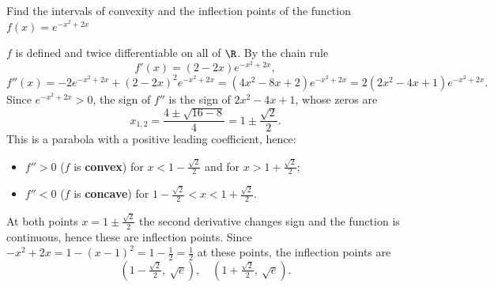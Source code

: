 
\begin{question}
Find the intervals of convexity and the inflection points of the function $f(x)=e^{-x^2+2x}$
\end{question}

\begin{solution}
$f$ is defined and twice differentiable on all of $\R$. By the chain rule
\[ f'(x)=(2-2x)e^{-x^2+2x}, \]
\[ f''(x)=-2e^{-x^2+2x}+(2-2x)^2e^{-x^2+2x}=(4x^2-8x+2)e^{-x^2+2x}=2(2x^2-4x+1)e^{-x^2+2x}. \]
Since $e^{-x^2+2x}>0$, the sign of $f''$ is the sign of $2x^2-4x+1$, whose zeros are
\[ x_{1,2}=\frac{4\pm\sqrt{16-8}}{4}=1\pm\frac{\sqrt2}{2}. \]
This is a parabola with a positive leading coefficient, hence:
\begin{itemize}
  \item $f''>0$ ($f$ is \textbf{convex}) for $x<1-\frac{\sqrt2}{2}$ and for $x>1+\frac{\sqrt2}{2}$;
  \item $f''<0$ ($f$ is \textbf{concave}) for $1-\frac{\sqrt2}{2}<x<1+\frac{\sqrt2}{2}$.
\end{itemize}
At both points $x=1\pm\frac{\sqrt2}{2}$ the second derivative changes sign and the function is continuous, hence these are inflection points. Since $-x^2+2x=1-(x-1)^2=1-\frac12=\frac12$ at these points, the inflection points are
\[ \boxed{\left(1-\tfrac{\sqrt2}{2},\ \sqrt e\right),\quad \left(1+\tfrac{\sqrt2}{2},\ \sqrt e\right)}. \]
\end{solution}
